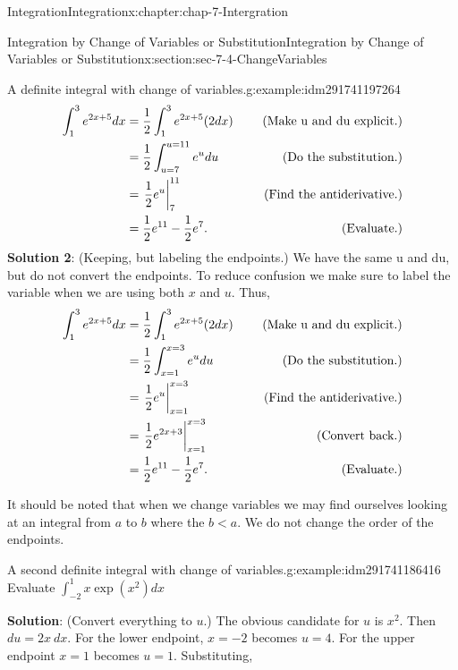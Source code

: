 \documentclass[oneside,10pt,]{book}
\newcommand{\terminology}[1]{\textbf{#1}}
\numberwithin{equation}{section}
\newcommand{\lt}{<}
\newcommand{\amp}{&}
\begin{document}
\begin{chapterptx}{Integration}{}{Integration}{}{}{x:chapter:chap-7-Intergration}
\begin{sectionptx}{Integration by Change of Variables or Substitution}{}{Integration by Change of Variables or Substitution}{}{}{x:section:sec-7-4-ChangeVariables}
\begin{example}{A definite integral with change of variables.}{g:example:idm291741197264}
%
\begin{equation*}
\begin{aligned}  \int_1^3 e^{2x+5} dx
\amp =\frac{1}{2} \int_1^3 e^{2x+5} (2dx)
\amp \quad \hbox{ (Make u and du explicit.)}\\ 
\amp =\frac{1}{2} \int_{u=7}^{u=11}e^u du
\amp \quad \hbox{ (Do the substitution.)}\\ 
\amp =\left.\frac{1}{2} e^u\right|_7^{11}
\amp \quad \hbox{ (Find the antiderivative.)}\\ 
\amp =\frac{1}{2} e^{11}-\frac{1}{2} e^7.
\amp \quad \hbox{ (Evaluate.)}\\ 
\end{aligned}
\end{equation*}
\terminology{Solution 2}:  (Keeping, but labeling the endpoints.) We have the same u and du, but do not convert the endpoints.  To reduce confusion we make sure to label the variable when we are using both \(x\) and \(u\).  Thus,%
%
\begin{equation*}
\begin{aligned}  \int_1^3 e^{2x+5} dx
\amp =\frac{1}{2} \int_1^3 e^{2x+5} (2dx)
\amp \quad \hbox{ (Make u and du explicit.)}\\ 
\amp =\frac{1}{2} \int_{x=1}^{x=3}e^u du
\amp \quad \hbox{ (Do the substitution.)}\\ 
\amp =\left.\frac{1}{2} e^u\right|_{x=1}^{x=3}
\amp \quad \hbox{ (Find the antiderivative.)}\\ 
\amp =\left.\frac{1}{2} e^{2x+3}\right|_{x=1}^{x=3}
\amp \quad \hbox{ (Convert back.)}\\ 
\amp =\frac{1}{2}  e^{11}-\frac{1}{2} e^7.
\amp \quad \hbox{ (Evaluate.)}\\ 
\end{aligned}
\end{equation*}
\end{example}
It should be noted that when we change variables we may find ourselves looking at an integral from \(a\) to \(b\) where the \(b \lt a\).  We do not change the order of the endpoints.%
\begin{example}{A second definite integral with change of variables.}{g:example:idm291741186416}%
Evaluate \(\int_{-2}^1 x \exp(x^2)dx\)%
\par
\terminology{Solution}: (Convert everything to \(u\).) The obvious candidate for \(u\) is \(x^2\).  Then \(du=2x\  dx\). For the lower endpoint, \(x=-2\) becomes \(u=4\).  For the upper endpoint \(x=1\) becomes \(u=1\). Substituting,%
%
\begin{equation*}

\end{equation*}
\end{example}
\end{sectionptx}
\end{chapterptx}
\end{document}
